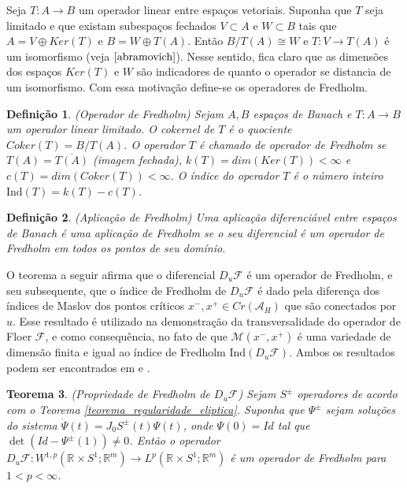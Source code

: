 \documentclass[12pt]{book}
\newtheorem{teorema}{Teorema}[section]
\newtheorem{definicao}[teorema]{Definição}
\newcommand{\circulo}{S^{1}}
\newcommand{\diferencialfloerponto}[1]{D_{#1}\operadorFloer}
\newcommand{\energiafinitaM}{\mathcal{M}}
\newcommand{\energiafinitaMconectante}{\energiafinitaM(x^{-}, x^{+})}
\newcommand{\espacoLpcontradominio}[2]{L^{p}(#1;#2)}
\newcommand{\espacosobolevcontradominio}[2]{W^{1,p}(#1;#2)}
\newcommand{\estruturacomplexa}{J_{0}}
\newcommand{\funcionalH}{\mathcal{A}_{H}}
\newcommand{\ind}{\text{Ind}}
\newcommand{\operadorFloer}{\mathcal{F}}
\newcommand{\pontoscriticos}[1]{\textit{Cr}(#1)}
\newcommand{\retacartesianocirculo}{\real{} \times \circulo}
\newcommand{\real}[1]{\mathbb{R}^{#1}}
\begin{document}
	Seja $T:A\to B$ um operador linear entre espaços vetoriais. Suponha que $T$ seja limitado e que existam subespaços fechados $V \subset A$ e $W \subset B$ tais que $A=V\oplus Ker(T)$ e $B=W\oplus T(A)$. Então $B/T(A) \cong W$ e $T:V \to T(A)$ é um isomorfismo (veja $\cite{abramovich}$). Nesse sentido, fica claro que as dimensões dos espaços $Ker(T)$ e $W$ são indicadores de quanto o operador se distancia de um isomorfismo. Com essa motivação define-se os operadores de Fredholm.
	
	\begin{definicao}\label{definicao_operador_fredholm}
		(Operador de Fredholm) Sejam $A, B$ espaços de Banach e $T: A\to B$ um operador linear limitado. O cokernel de $T$ é o quociente $Coker(T)=B/T(A)$. O operador $T$ é chamado de operador de Fredholm se $T(A)=\overline{T(A)}$ (imagem fechada), $k(T) = dim(Ker(T)) < \infty$ e $c(T)=dim(Coker(T)) < \infty$. O índice do operador $T$ é o número inteiro $\ind(T) = k(T) - c(T)$. 
	\end{definicao}
	
	\begin{definicao}
		(Aplicação de Fredholm) Uma aplicação diferenciável entre espaços de Banach é uma aplicação de Fredholm se o seu diferencial é um operador de Fredholm em todos os pontos de seu domínio.
	\end{definicao}
	
	
	O teorema a seguir afirma que o diferencial $\diferencialfloerponto{u}$ é um operador de Fredholm, e seu subsequente, que o índice de Fredholm de $\diferencialfloerponto{u}$ é dado pela diferença dos índices de Maslov dos pontos críticos $x^{-}, x^{+} \in \pontoscriticos{\funcionalH}$ que são conectados por $u$. Esse resultado é utilizado na demonstração da transversalidade do operador de Floer $\operadorFloer$, e como consequência, no fato de que $\energiafinitaMconectante$ é uma variedade de dimensão finita e igual ao índice de Fredholm $\ind(\diferencialfloerponto{u})$. Ambos os resultados podem ser encontrados em \cite{audi_floer_homology} e \cite{salamon_zehnder}.
	
	\begin{teorema}\label{teorema_propriedade_fredholm}
		(Propriedade de Fredholm de $\diferencialfloerponto{u}$) Sejam $S^{\pm}$ operadores de acordo com o Teorema \ref{teorema_regularidade_eliptica}. Suponha que $\Psi^{\pm}$ sejam soluções do sistema $\dot{\Psi}(t) = \estruturacomplexa S^{\pm}(t)\Psi(t)$, onde $\Psi(0)=Id$ tal que $\det(Id-\Psi^{\pm}(1))\neq 0$. Então o operador $\diferencialfloerponto{u}: \espacosobolevcontradominio{\retacartesianocirculo}{\real{m}}\to \espacoLpcontradominio{\retacartesianocirculo}{\real{m}}$ é um operador de Fredholm para $1<p<\infty$.
	\end{teorema}
	
\end{document}
